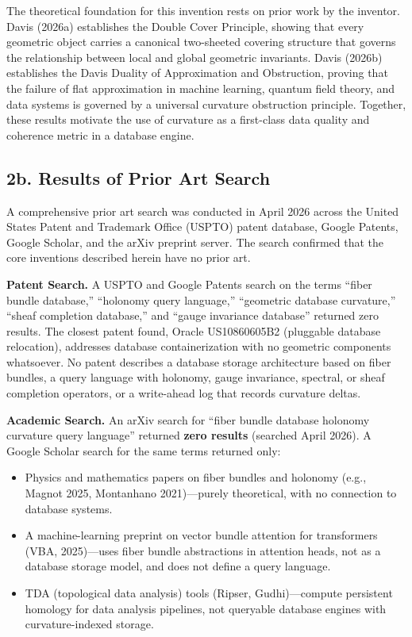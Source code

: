 \documentclass[11pt,letterpaper]{article}
\begin{document}
The theoretical foundation for this invention rests on prior work by the inventor. Davis (2026a) establishes the Double Cover Principle, showing that every geometric object carries a canonical two-sheeted covering structure that governs the relationship between local and global geometric invariants. Davis (2026b) establishes the Davis Duality of Approximation and Obstruction, proving that the failure of flat approximation in machine learning, quantum field theory, and data systems is governed by a universal curvature obstruction principle. Together, these results motivate the use of curvature as a first-class data quality and coherence metric in a database engine.


\subsection*{2b. Results of Prior Art Search}

A comprehensive prior art search was conducted in April 2026 across the United States Patent and Trademark Office (USPTO) patent database, Google Patents, Google Scholar, and the arXiv preprint server. The search confirmed that the core inventions described herein have no prior art.

\textbf{Patent Search.} A USPTO and Google Patents search on the terms ``fiber bundle database,'' ``holonomy query language,'' ``geometric database curvature,'' ``sheaf completion database,'' and ``gauge invariance database'' returned zero results. The closest patent found, Oracle US10860605B2 (pluggable database relocation), addresses database containerization with no geometric components whatsoever. No patent describes a database storage architecture based on fiber bundles, a query language with holonomy, gauge invariance, spectral, or sheaf completion operators, or a write-ahead log that records curvature deltas.

\textbf{Academic Search.} An arXiv search for ``fiber bundle database holonomy curvature query language'' returned \textbf{zero results} (searched April 2026). A Google Scholar search for the same terms returned only:
\begin{itemize}
  \item Physics and mathematics papers on fiber bundles and holonomy (e.g., Magnot 2025, Montanhano 2021)---purely theoretical, with no connection to database systems.
  \item A machine-learning preprint on vector bundle attention for transformers (VBA, 2025)---uses fiber bundle abstractions in attention heads, not as a database storage model, and does not define a query language.
  \item TDA (topological data analysis) tools (Ripser, Gudhi)---compute persistent homology for data analysis pipelines, not queryable database engines with curvature-indexed storage.
\end{itemize}
\end{document}

